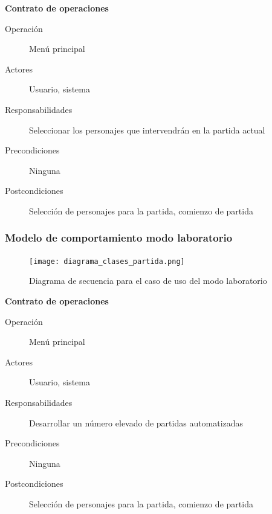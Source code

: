 \textbf{Contrato de operaciones}
\begin{description}
    \item[Operación] Menú principal
    \item[Actores] Usuario, sistema 
    \item[Responsabilidades] Seleccionar los personajes que intervendrán en la partida actual
    \item[Precondiciones] Ninguna
    \item[Postcondiciones] Selección de personajes para la partida, comienzo de partida
\end{description}

\subsubsection{Modelo de comportamiento modo laboratorio}

\begin{figure}[h]
  \label{diagrama_clases_laboratorio}
  \begin{center}
    \texttt{[image: diagrama\_clases\_partida.png]}
  \end{center}
  \caption{Diagrama de secuencia para el caso de uso del modo laboratorio}
\end{figure}

\textbf{Contrato de operaciones}
\begin{description}
    \item[Operación] Menú principal
    \item[Actores] Usuario, sistema
    \item[Responsabilidades] Desarrollar un número elevado de partidas automatizadas
    \item[Precondiciones] Ninguna
    \item[Postcondiciones] Selección de personajes para la partida, comienzo de partida
\end{description}



